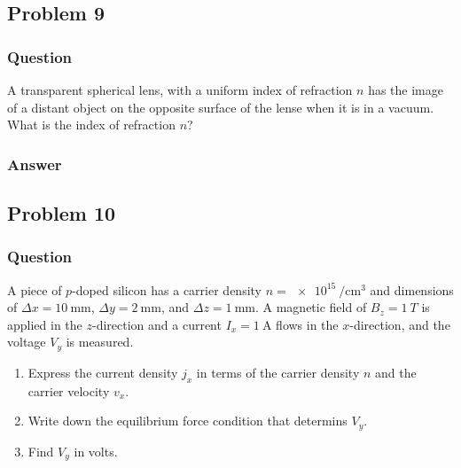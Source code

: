 \clearpage
\subsection{Problem 9}
\subsubsection{Question}

A transparent spherical lens, with a uniform index of refraction $n$ has the
image of a distant object on the opposite surface of the lense when it is in
a vacuum. What is the index of refraction $n$?

\subsubsection{Answer}

\clearpage
\subsection{Problem 10}
\subsubsection{Question}

A piece of $p$-doped silicon has a carrier density
$n=\SI[per-mode=reciprocal]{e15}{\per\cm\cubed}$ and dimensions of $Δx =
\SI{10}{\mm}$, $Δy = \SI{2}{\mm}$, and $Δz = \SI{1}{\mm}$. A magnetic field
of $B_z = \SI{1}{T}$ is applied in the $z$-direction and a current $I_x =
\SI{1}{\A}$ flows in the $x$-direction, and the voltage $V_y$ is measured.
\begin{enumerate}
	\item
		Express the current density $j_x$ in terms of the carrier density $n$
		and the carrier velocity $v_x$.
	\item
		Write down the equilibrium force condition that determins $V_y$.
	\item
		Find $V_y$ in volts.
\end{enumerate}

